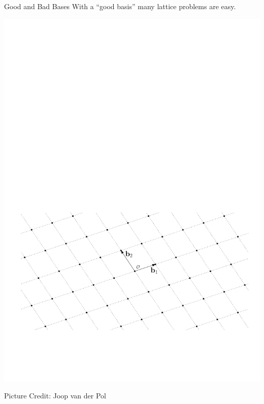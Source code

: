 \documentclass[presentation,smaller]{beamer}
\begin{document}
\begin{frame}[label={sec:orgheadline12}]{Good and Bad Bases}
With a “good basis” many lattice problems are easy.

\begin{center}
\includegraphics[width=.9\linewidth]{./joop-latt1.pdf}
\end{center}

\tiny Picture Credit: Joop van der Pol
\end{frame}
\end{document}
